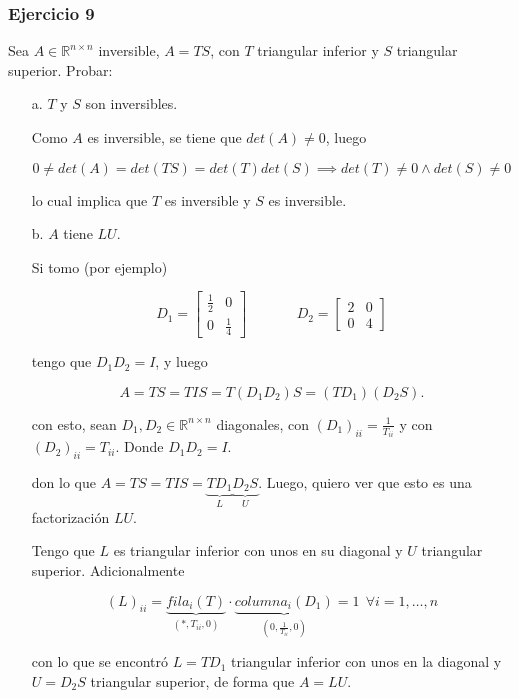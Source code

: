 \subsubsection{Ejercicio 9}
\label{subsubsec:guia_2_ej_9}

Sea $A \in \mathbb{R}^{n \times n}$ inversible, $A = TS$, con $T$ triangular inferior y $S$ triangular superior. Probar:

\begin{itemize}
    \item[a.] $T$ y $S$ son inversibles.
    
    Como $A$ es inversible, se tiene que $det(A) \neq 0$, luego
    
    \[0 \neq det(A) = det(TS) = det(T)det(S) \implies det(T) \neq 0 \land det(S) \neq 0\]
    
    lo cual implica que $T$ es inversible y $S$ es inversible.
    
    \item[b.] $A$ tiene $LU$.
    
    Si tomo (por ejemplo)
    
    \[
    D_1 = 
    \begin{bmatrix}
        \frac{1}{2} & 0 \\
        0 & \frac{1}{4}
    \end{bmatrix}
    ~~~~~~~~~~~~~~~~
    D_2 = 
    \begin{bmatrix}
        2 & 0 \\
        0 & 4
    \end{bmatrix}
    \]
    
    tengo que $D_1 D_2 = I$, y luego
    
    \[A = TS = TIS = T(D_1 D_2)S = (TD_1)(D_2 S).\]
    
    con esto, sean $D_1 , D_2 \in \mathbb{R}^{n \times n}$ diagonales, con ${(D_1)}_{ii} =  \frac{1}{T_{ii}}$ y con ${(D_2)}_{ii} = T_{ii}$. Donde $D_1 D_2 = I$.
    
    don lo que $A = TS = TIS = \underbrace{TD_1}_{L}\underbrace{D_2 S}_{U}$. Luego, quiero ver que esto es una factorización $LU$.
    
    Tengo que $L$ es triangular inferior con unos en su diagonal y $U$ triangular superior. Adicionalmente
    
    \[(L)_{ii} = \underbrace{fila_i(T)}_{(*,T_{ii},0)}\cdot \underbrace{columna_i(D_1)}_{(0,\frac{1}{T_{ii}},0)} = 1 ~~\forall i = 1,\ldots,n\]
    
    con lo que se encontró $L = TD_1$ triangular inferior con unos en la diagonal y $U = D_2 S$ triangular superior, de forma que $A = LU$.
    

\end{itemize}
